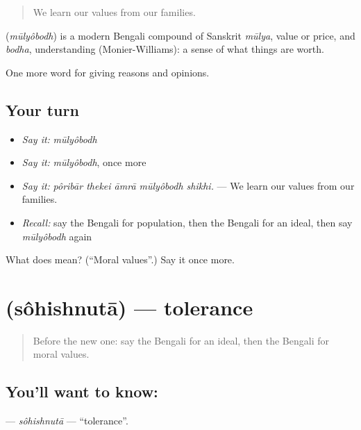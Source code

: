 \begin{quote}
We learn our values from our families.
\end{quote}

\begin{cousinweb}
\textbf{} (\emph{mūlyôbodh}) is a modern Bengali compound of Sanskrit \emph{mūlya}, value or price, and \emph{bodha}, understanding (Monier-Williams): a sense of what things are worth.
\end{cousinweb}

\begin{grammarlens}[title={What you've built}]
One more word for giving reasons and opinions.
\end{grammarlens}

\subsection*{Your turn}
\begin{itemize}
\raggedright
  \item \emph{Say it:} \emph{mūlyôbodh}
  \item \emph{Say it:} \emph{mūlyôbodh}, once more
  \item \emph{Say it:} \emph{pôribār thekei āmrā mūlyôbodh shikhi.} — We learn our values from our families.
  \item \emph{Recall:} say the Bengali for population, then the Bengali for an ideal, then say \emph{mūlyôbodh} again
\end{itemize}

\begin{tcolorbox}[breakable,colback=teal!4,colframe=teal!35!black,title={Before you move on}]
What does  mean? (\textquotedblleft{}Moral values\textquotedblright{}.) Say it once more.
\end{tcolorbox}
\section[\texorpdfstring{\bn{সহিষ্ণুতা} (sôhishnutā)}{সহিষ্ণুতা (sôhishnutā)}]{ (sôhishnutā) — tolerance}

\label{lesson:BN-C350-sohishnuta}



\begin{quote}
Before the new one: say the Bengali for an ideal, then the Bengali for moral values.
\end{quote}

\subsection*{You'll want to know: }
\textbf{} — \emph{sôhishnutā} — \textquotedblleft{}tolerance\textquotedblright{}.

